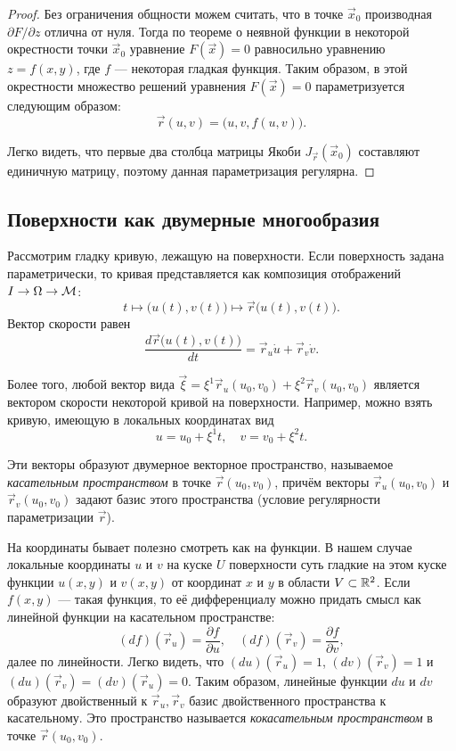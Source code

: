 \begin{proof}
	Без ограничения общности можем считать, что в точке $\vec{x}_0$ производная $\partial F / \partial z$ отлична от нуля. Тогда по теореме о неявной функции в некоторой окрестности точки $\vec{x}_0$ уравнение $F(\vec{x}) = 0$ равносильно уравнению $z = f(x, y)$, где $f$ --- некоторая гладкая функция. Таким образом, в этой окрестности множество решений уравнения $F(\vec{x}) = 0$ параметризуется следующим образом:
	\[
		\vec{r}(u, v) = \big(u, v, f(u, v)\big).
	\]

	Легко видеть, что первые два столбца матрицы Якоби $J_{\vec{r}}(\vec{x}_0)$ составляют единичную матрицу, поэтому данная параметризация регулярна.
\end{proof}

\subsection{Поверхности как двумерные многообразия}

Рассмотрим гладку кривую, лежащую на поверхности. Если поверхность задана параметрически, то кривая представляется как композиция отображений $I \to \Omega \to \mathcal{M}$:
\[
	t \mapsto \big(u(t), v(t)\big) \mapsto \vec{r}\big(u(t), v(t)\big).
\]
Вектор скорости равен
\[
	\frac{d\vec{r}\big(u(t), v(t)\big)}{dt} = \vec{r}_u\dot{u} + \vec{r}_v\dot{v}.
\]

Более того, любой вектор вида $\vec{\xi} = \xi^1\vec{r}_u(u_0, v_0) + \xi^2\vec{r}_v(u_0, v_0)$ является вектором скорости некоторой кривой на поверхности. Например, можно взять кривую, имеющую в локальных координатах вид
\[
	u = u_0 + \xi^1t,\quad v = v_0 + \xi^2t.
\]

Эти векторы образуют двумерное векторное пространство, называемое \textit{касательным пространством} в точке $\vec{r}(u_0, v_0)$, причём векторы $\vec{r}_u(u_0, v_0)$ и $\vec{r}_v(u_0, v_0)$ задают базис этого пространства (условие регулярности параметризации $\vec{r}$).

На координаты бывает полезно смотреть как на функции. В нашем случае локальные координаты $u$ и $v$ на куске $U$ поверхности суть гладкие на этом куске функции $u(x, y)$ и $v(x, y)$ от координат $x$ и $y$ в области $V \subset \mathbb{R}^2$. Если $f(x, y)$ --- такая функция, то её дифференциалу можно придать смысл как линейной функции на касательном пространстве:
\[
	(df)(\vec{r}_u) = \frac{\partial f}{\partial u},\quad(df)(\vec{r}_v) = \frac{\partial f}{\partial v},
\]
далее по линейности. Легко видеть, что $(du)(\vec{r}_u) = 1$, $(dv)(\vec{r}_v) = 1$ и $(du)(\vec{r}_v) = (dv)(\vec{r}_u) = 0$. Таким образом, линейные функции $du$ и $dv$ образуют двойственный к $\vec{r}_u, \vec{r}_v$ базис двойственного пространства к касательному. Это пространство называется \textit{кокасательным пространством} в точке $\vec{r}(u_0, v_0)$.

